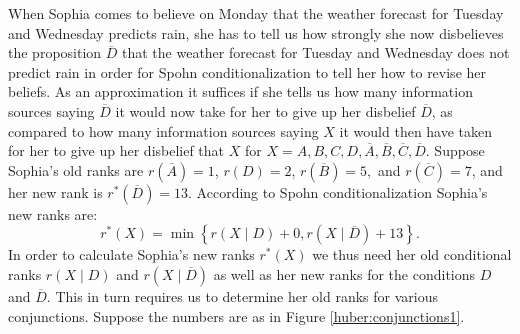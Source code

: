 When Sophia comes to believe on Monday that the weather forecast for Tuesday and Wednesday predicts rain, she has to tell us how strongly she now disbelieves the proposition $\overline{D}$ that the weather forecast for Tuesday and Wednesday does not predict rain in order for Spohn conditionalization to tell her how to revise her beliefs. As an approximation it suffices if she tells us how many information sources saying $\overline{D}$ it would now take for her to give up her disbelief $\overline{D}$, as compared to how many information sources saying $X$ it would then have taken for her to give up her disbelief that $X$ for $X=A,B,C,D,\overline{A},\overline{B},\overline{C},\overline{D}$. Suppose Sophia's old ranks are $r(\overline{A})=1$, $r(D)=2$, $r(\overline{B})=5,$ and $r(\overline{C})=7$, and her new rank is $r^*(\overline{D})=13$. According to Spohn conditionalization Sophia's new ranks are:%
$$r^*\left(X\right)=\min\left\{r\left(X\mid D\right)+0,r\left(X\mid\overline{D}\right)+13\right\}.$$
In order to calculate Sophia's new ranks $r^*(X)$ we thus need her old conditional ranks $r(X\mid D)$ and $r(X\mid\overline{D})$ as well as her new ranks for the conditions $D$ and $\overline{D}$. This in turn requires us to determine her old ranks for various conjunctions. Suppose %
the numbers are as in Figure \ref{huber:conjunctions1}.
